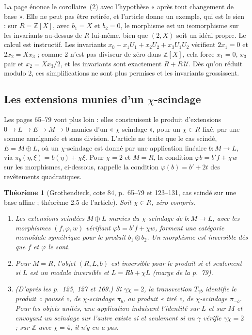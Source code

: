 \documentclass[11pt,a4paper]{amsart}
\theoremstyle{definition}
\theoremstyle{plain}
\newtheorem{theoreme}{Théorème}
\theoremstyle{remark}
\theoremstyle{plain}
\newcommand{\Z}{\mathbb Z}
\begin{document}
La page énonce le corollaire~(2) avec l'hypothèse « après tout changement de base ». Elle ne peut pas être retirée, et l'article donne un exemple, qui est le sien : sur $R = \Z[X]$, avec $b_1 = X$ et $b_2 = 0$, le morphisme est un isomorphisme sur les invariants au-dessus de $R$ lui-même, bien que $(2, X)$ soit un idéal propre. Le calcul est instructif. Les invariants $x_0 + x_1U_1 + x_2U_2 + x_3U_1U_2$ vérifient $2x_1 = 0$ et $2x_2 = Xx_3$ ; comme $2$ n'est pas diviseur de zéro dans $\Z[X]$, cela force $x_1 = 0$, $x_3$ pair et $x_2 = X x_3/2$, et les invariants sont exactement $R + R\,\mathcal U$. Dès qu'on réduit modulo $2$, ces simplifications ne sont plus permises et les invariants grossissent.

\subsection{Les extensions munies d'un \texorpdfstring{$\chi$}{chi}-scindage}

Les pages 65--79 vont plus loin : elles construisent le produit d'extensions $0 \to L \to E \to M \to 0$ munies d'un « $\chi$-scindage », pour un $\chi \in R$ fixé, par une somme amalgamée et sans division. L'article ne traite que le cas scindé, $E = M \oplus L$, où un $\chi$-scindage est donné par une application linéaire $b \colon M \to L$, via $\pi_b(\eta, \xi) = b(\eta) + \chi\xi$. Pour $\chi = 2$ et $M = R$, la condition $\varphi b = b'f + \chi w$ sur les morphismes, ci-dessous, rappelle la condition $\varphi(b) = b' + 2t$ des revêtements quadratiques.

\begin{theoreme}[Grothendieck, cote 84, p.~65--79 et 123--131, cas scindé sur une base affine ; théorème 2.5 de l'article]
Soit $\chi \in R$, zéro compris.
\begin{enumerate}
\item Les extensions scindées $M \oplus L$ munies du $\chi$-scindage de $b \colon M \to L$, avec les morphismes $(f, \varphi, w)$ vérifiant $\varphi b = b'f + \chi w$, forment une catégorie monoïdale symétrique pour le produit $b_1\otimes b_2$. Un morphisme est inversible dès que $f$ et $\varphi$ le sont.
\item Pour $M = R$, l'objet $(R, L, b)$ est inversible pour le produit si et seulement si $L$ est un module inversible et $L = Rb + \chi L$ (marge de la p.~79).
\item \emph{(D'après les p.~125, 127 et 169.)} Si $\gamma\chi = 2$, la transvection $T_{\gamma b}$ identifie le produit « poussé », de $\chi$-scindage $\pi_b$, au produit « tiré », de $\chi$-scindage $\pi_{-b}$. Pour les objets unités, une application induisant l'identité sur $L$ et sur $M$ et envoyant un scindage sur l'autre existe si et seulement si un $\gamma$ vérifie $\gamma\chi = 2$ ; sur $\Z$ avec $\chi = 4$, il n'y en a pas.
\end{enumerate}
\end{theoreme}
\end{document}
